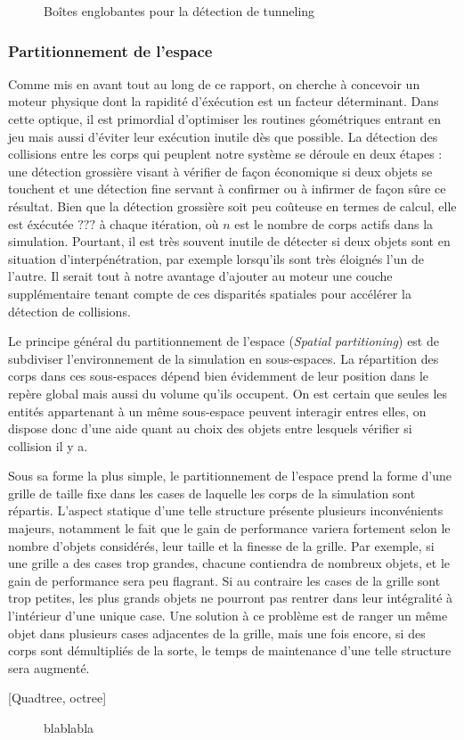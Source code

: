 \begin{figure}
  \centering
  
  \caption{Boîtes englobantes pour la détection de tunneling}
  \label{tunneling3}
\end{figure}

\subsubsection{Partitionnement de l'espace}

Comme mis en avant tout au long de ce rapport, on cherche à concevoir
un moteur physique dont la rapidité d'éxécution est un facteur
déterminant. Dans cette optique, il est primordial d'optimiser les
routines géométriques entrant en jeu mais aussi d'éviter leur
exécution inutile dès que possible. La détection des collisions entre
les corps qui peuplent notre système se déroule en deux étapes : une
détection grossière visant à vérifier de façon économique si deux
objets se touchent et une détection fine servant à confirmer ou à
infirmer de façon sûre ce résultat. Bien que la détection grossière
soit peu coûteuse en termes de calcul, elle est éxécutée $???$ à
chaque itération, o\`u $n$ est le nombre de corps actifs dans la
simulation. Pourtant, il est très souvent inutile de détecter si deux
objets sont en situation d'interpénétration, par exemple lorsqu'ils
sont très éloignés l'un de l'autre. Il serait tout à notre avantage
d'ajouter au moteur une couche supplémentaire tenant compte de ces
disparités spatiales pour accélérer la détection de collisions.

Le principe général du partitionnement de l'espace (\textit{Spatial
  partitioning}) est de subdiviser l'environnement de la simulation en
sous-espaces. La répartition des corps dans ces sous-espaces dépend
bien évidemment de leur position dans le repère global mais aussi du
volume qu'ils occupent. On est certain que seules les entités
appartenant à un même sous-espace peuvent interagir entres elles, on
dispose donc d'une aide quant au choix des objets entre lesquels
vérifier si collision il y a.

Sous sa forme la plus simple, le partitionnement de l'espace prend la
forme d'une grille de taille fixe dans les cases de laquelle les corps
de la simulation sont répartis. L'aspect statique d'une telle
structure présente plusieurs inconvénients majeurs, notamment le fait
que le gain de performance variera fortement selon le nombre d'objets
considérés, leur taille et la finesse de la grille. Par exemple, si
une grille a des cases trop grandes, chacune contiendra de nombreux
objets, et le gain de performance sera peu flagrant. Si au contraire
les cases de la grille sont trop petites, les plus grands objets ne
pourront pas rentrer dans leur intégralité à l'intérieur d'une unique
case. Une solution à ce problème est de ranger un même objet dans
plusieurs cases adjacentes de la grille, mais une fois encore, si des
corps sont démultipliés de la sorte, le temps de maintenance d'une
telle structure sera augmenté.

[Quadtree, octree]

\begin{figure}
  \centering
  \subfloat[]{  }
  \subfloat[]{  }
  \caption{blablabla}
  \label{quadtree}
\end{figure}
